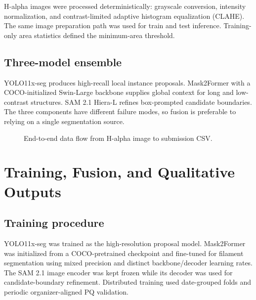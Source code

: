 \documentclass[sigconf]{acmart}
\begin{document}
H-alpha images were processed deterministically: grayscale conversion, intensity normalization, and contrast-limited adaptive histogram equalization (CLAHE). The same image preparation path was used for train and test inference. Training-only area statistics defined the minimum-area threshold.

\subsection{Three-model ensemble}
YOLO11x-seg produces high-recall local instance proposals. Mask2Former with a COCO-initialized Swin-Large backbone supplies global context for long and low-contrast structures. SAM 2.1 Hiera-L refines box-prompted candidate boundaries. The three components have different failure modes, so fusion is preferable to relying on a single segmentation source.

\begin{figure}[t]
\centering
{}
\caption{End-to-end data flow from H-alpha image to submission CSV.}
\label{fig:pipeline}
\end{figure}

\clearpage
\section{Training, Fusion, and Qualitative Outputs}
\subsection{Training procedure}
YOLO11x-seg was trained as the high-resolution proposal model. Mask2Former was initialized from a COCO-pretrained checkpoint and fine-tuned for filament segmentation using mixed precision and distinct backbone/decoder learning rates. The SAM 2.1 image encoder was kept frozen while its decoder was used for candidate-boundary refinement. Distributed training used date-grouped folds and periodic organizer-aligned PQ validation.
\end{document}
